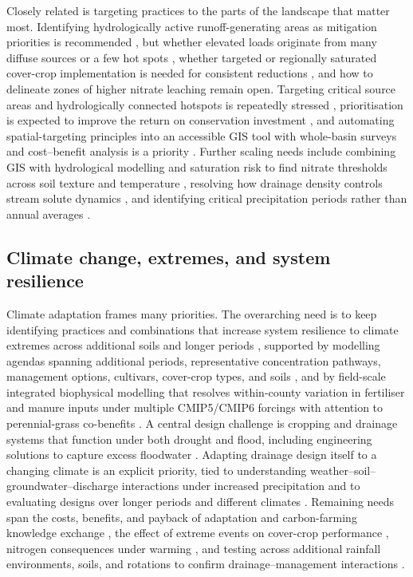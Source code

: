 Closely related is targeting practices to the parts of the landscape that matter
most. Identifying hydrologically active runoff-generating areas as mitigation
priorities is recommended \parencite{Melland2008}, but whether elevated loads
originate from many diffuse sources or a few hot spots
\parencite{Irvine2019}, whether targeted or regionally saturated cover-crop
implementation is needed for consistent reductions \parencite{Speir2022}, and how
to delineate zones of higher nitrate leaching \parencite{Bakhsh2005b} remain
open. Targeting critical source areas and hydrologically connected hotspots is
repeatedly stressed \parencite{McDowell2015,Brendel2019}, prioritisation is
expected to improve the return on conservation investment
\parencite{Makhtoumi2025}, and automating spatial-targeting principles into an
accessible GIS tool with whole-basin surveys and cost--benefit analysis is a
priority \parencite{Kvítek2023}. Further scaling needs include combining GIS with
hydrological modelling and saturation risk to find nitrate thresholds across
soil texture and temperature \parencite{Smith2023}, resolving how drainage
density controls stream solute dynamics \parencite{Kennedy2012}, and identifying
critical precipitation periods rather than annual averages \parencite{Salo2006}.

\subsection{Climate change, extremes, and system resilience}

Climate adaptation frames many priorities. The overarching need is to keep
identifying practices and combinations that increase system resilience to
climate extremes across additional soils and longer periods
\parencite{Saha2024}, supported by modelling agendas spanning additional
periods, representative concentration pathways, management options, cultivars,
cover-crop types, and soils \parencite{Malone2020}, and by field-scale
integrated biophysical modelling that resolves within-county variation in
fertiliser and manure inputs under multiple CMIP5/CMIP6 forcings with attention
to perennial-grass co-benefits \parencite{Ferin2023}. A central design
challenge is cropping and drainage systems that function under both drought and
flood, including engineering solutions to capture excess floodwater
\parencite{Dietzel2016}. Adapting drainage design itself to a changing climate is
an explicit priority, tied to understanding weather--soil--groundwater--discharge
interactions under increased precipitation and to evaluating designs over longer
periods and different climates
\parencite{Deelstra2015,Tuohy2018,Malota2024,Deelstra2014,Deelstra2014b}.
Remaining needs span the costs, benefits, and payback of adaptation and
carbon-farming knowledge exchange \parencite{PeltonenSainio2021}, the effect of
extreme events on cover-crop performance \parencite{Gupta2023b}, nitrogen
consequences under warming \parencite{Haghnazari2020}, and testing across
additional rainfall environments, soils, and rotations to confirm
drainage--management interactions
\parencite{Takeshima2023,Liu2025,Grewal2025,Negm2014,BENOIT1967}.

